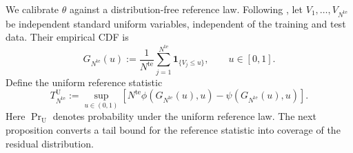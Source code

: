 \documentclass[review,11pt,3p,authoryear,nopreprintline]{elsarticle}
\begin{document}
We calibrate $\theta$ against a distribution-free reference law. Following \citet{L.J23}, let $V_1,\ldots,V_{N^{\mathrm{te}}}$ be independent standard uniform variables, independent of the training and test data. Their empirical CDF is
\begin{equation}
  G_{N^{\mathrm{te}}}(u):=\frac{1}{N^{\mathrm{te}}}\sum_{j=1}^{N^{\mathrm{te}}}\mathbf 1_{\{V_j\le u\}},\qquad u\in[0,1].
  \label{eq-dw-reference-cdf}
\end{equation}
Define the uniform reference statistic
\begin{equation}
  T_{N^{\mathrm{te}}}^{\mathrm U}:=\sup_{u\in(0,1)}\left[N^{\mathrm{te}}\phi\!\left(G_{N^{\mathrm{te}}}(u),u\right)-\psi\!\left(G_{N^{\mathrm{te}}}(u),u\right)\right].
  \label{eq-dw-reference-statistic}
\end{equation}
Here $\Pr_{\mathrm U}$ denotes probability under the uniform reference law. The next proposition converts a tail bound for the reference statistic into coverage of the residual distribution.
\end{document}
